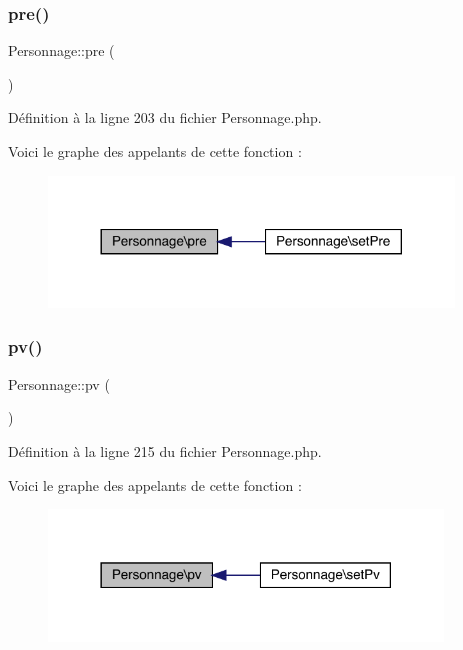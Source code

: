 \subsubsection{\texorpdfstring{pre()}{pre()}}
{\footnotesize\ttfamily Personnage\+::pre (\begin{DoxyParamCaption}{ }\end{DoxyParamCaption})}



Définition à la ligne 203 du fichier Personnage.\+php.

Voici le graphe des appelants de cette fonction \+:\nopagebreak
\begin{figure}[H]
\begin{center}
\leavevmode
\includegraphics[width=305pt]{class_personnage_ae7675cda70f8e9488d1b4e28550a0871_icgraph}
\end{center}
\end{figure}
\mbox{\label{class_personnage_ac33d3de759181a59960066291c8065a9}} 
\subsubsection{\texorpdfstring{pv()}{pv()}}
{\footnotesize\ttfamily Personnage\+::pv (\begin{DoxyParamCaption}{ }\end{DoxyParamCaption})}



Définition à la ligne 215 du fichier Personnage.\+php.

Voici le graphe des appelants de cette fonction \+:\nopagebreak
\begin{figure}[H]
\begin{center}
\leavevmode
\includegraphics[width=297pt]{class_personnage_ac33d3de759181a59960066291c8065a9_icgraph}
\end{center}
\end{figure}
\mbox{\label{class_personnage_ae8daf1e07c298cf03a98b6b06d3adfd9}} 
